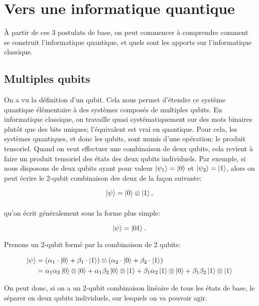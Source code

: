 \section{Vers une informatique quantique}
\`A partir de ces 3 postulats de base, on peut commencer à comprendre comment se construit l'informatique quantique, et quels sont les apports sur l'informatique classique.

\subsection{Multiples qubits}
On a vu la définition d'un qubit. Cela nous permet d'étendre ce système quantique élémentaire à des systèmes composés de multiples qubits. En informatique classique, on travaille quasi systématiquement sur des mots binaires plutôt que des bits uniques; l'équivalent est vrai en quantique. Pour cela, les systèmes quantiques, et donc les qubits, sont munis d'une opération: le produit tensoriel. Quand on veut effectuer une combinaison de deux qubits, cela revient à faire un produit tensoriel des états des deux qubits individuels. Par exemple, si nous disposons de deux qubits ayant pour valeur $\ket{\psi_1} = \ket{0}$ et $\ket{\psi_2} = \ket{1}$, alors on peut écrire le 2-qubit combinaison des deux de la façon suivante:


\begin{equation}
    \ket{\psi} = \ket{0} \mathbin{\mathop{\otimes}\limits_{}} \ket{1},
\end{equation}

qu'on écrit généralement sous la forme plus simple:

\begin{equation}
    \ket{\psi} = \ket{01}.
\end{equation}

Prenons un 2-qubit formé par la combinaison de 2 qubits:

\begin{align*}
\ket{\psi} &= (\alpha_1\cdot\ket{0} + \beta_1\cdot\ket{1}) \otimes (\alpha_2\cdot\ket{0} + \beta_2\cdot\ket{1}) \\
&= \alpha_1\alpha_2 \ket{0} \otimes \ket{0} + \alpha_1\beta_2 \ket{0} \otimes \ket{1} + \beta_1\alpha_2 \ket{1} \otimes \ket{0} + \beta_1\beta_2 \ket{1} \otimes \ket{1}
\end{align*}

On peut donc, si on a un 2-qubit combinaison linéaire de tous les états de base, le séparer en deux qubits individuels, sur lesquels on va pouvoir agir.

